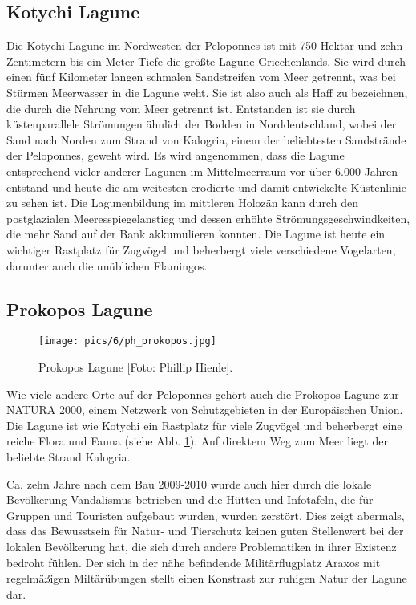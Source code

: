 \documentclass[preprint]{geomorphica} %
\begin{document}
\subsection{Kotychi Lagune}

Die Kotychi Lagune im Nordwesten der Peloponnes ist mit 750 Hektar und zehn Zentimetern bis ein Meter Tiefe die größte Lagune Griechenlands. Sie wird durch einen fünf Kilometer langen schmalen Sandstreifen vom Meer getrennt, was bei Stürmen Meerwasser in die Lagune weht. Sie ist also auch als Haff zu bezeichnen, die durch die Nehrung vom Meer getrennt ist. Entstanden ist sie durch küstenparallele Strömungen ähnlich der Bodden in Norddeutschland, wobei der Sand nach Norden zum Strand von Kalogria, einem der beliebtesten Sandstrände der Peloponnes, geweht wird. Es wird angenommen, dass die Lagune entsprechend vieler anderer Lagunen im Mittelmeerraum vor über 6.000 Jahren entstand \cite{unkelDrivingMechanismsHolocene2014} und heute die am weitesten erodierte und damit entwickelte Küstenlinie zu sehen ist. Die Lagunenbildung im mittleren Holozän kann durch den postglazialen Meeresspiegelanstieg und dessen erhöhte Strömungsgeschwindkeiten, die mehr Sand auf der Bank akkumulieren konnten. Die Lagune ist heute ein wichtiger Rastplatz für Zugvögel und beherbergt viele verschiedene Vogelarten, darunter auch die unüblichen Flamingos.

\subsection{Prokopos Lagune}

\begin{figure}[h]
    \centering
    \texttt{[image: pics/6/ph\_prokopos.jpg]}
    \caption{Prokopos Lagune [Foto: Phillip Hienle].}
    \label{pic:prokopos}
\end{figure}

Wie viele andere Orte auf der Peloponnes gehört auch die Prokopos Lagune zur NATURA 2000, einem Netzwerk von Schutzgebieten in der Europäischen Union. Die Lagune ist wie Kotychi ein Rastplatz für viele Zugvögel und beherbergt eine reiche Flora und Fauna (siehe Abb. \ref{pic:prokopos}). Auf direktem Weg zum Meer liegt der beliebte Strand Kalogria.

Ca. zehn Jahre nach dem Bau 2009-2010 wurde auch hier durch die lokale Bevölkerung Vandalismus betrieben und die Hütten und Infotafeln, die für Gruppen und Touristen aufgebaut wurden, wurden zerstört. Dies zeigt abermals, dass das Bewusstsein für Natur- und Tierschutz keinen guten Stellenwert bei der lokalen Bevölkerung hat, die sich durch andere Problematiken in ihrer Existenz bedroht fühlen. Der sich in der nähe befindende Militärflugplatz Araxos mit regelmäßigen Miltärübungen stellt einen Konstrast zur ruhigen Natur der Lagune dar.
\end{document}
